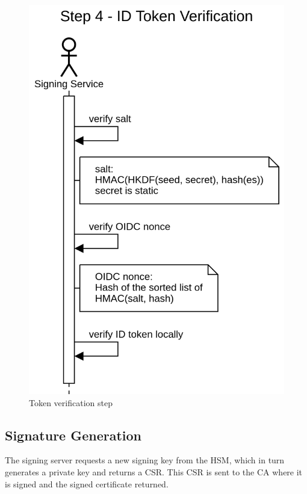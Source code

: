 \begin{figure}[h]
    \begin{center}
        \includegraphics[scale=0.5]{images/protocol_step4_id_token_verification.png}
        \caption{Token verification step}
        \label{fig:tokenverificationstep}
    \end{center}
\end{figure}

\subsection{Signature Generation}\label{subsec:signature-generation}
The signing server requests a new signing key from the \gls{HSM}, which in turn generates a private key and returns a \gls{CSR}.
This \gls{CSR} is sent to the \gls{CA} where it is signed and the signed certificate returned.

